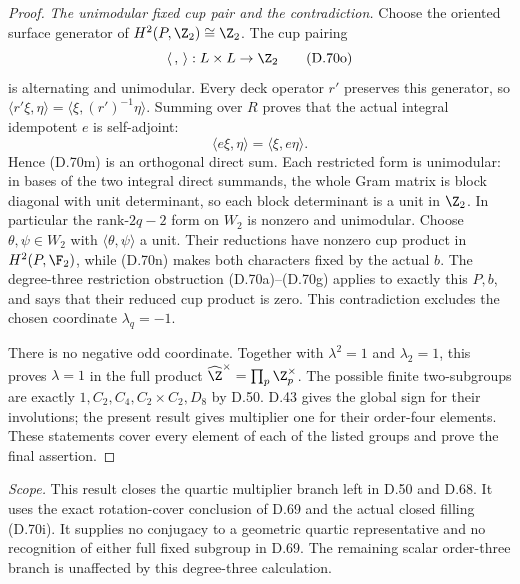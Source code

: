 \begin{proof}
\emph{The unimodular fixed cup pair and the contradiction.}
Choose the oriented surface generator of
$H^2(P,\Z_2)\cong\Z_2$.
The cup pairing
\[
               \langle\, ,\,\rangle:L\times L\to\Z_2
                                                               \tag{D.70o}
\]
is alternating and unimodular.
Every deck operator $r'$ preserves this generator,
so
$\langle r'\xi,\eta\rangle
 =\langle\xi,(r')^{-1}\eta\rangle$.
Summing over $R$ proves that the actual integral
idempotent $e$ is self-adjoint:
\[
                         \langle e\xi,\eta\rangle
                                  =\langle\xi,e\eta\rangle .
                                                               \tag{D.70p}
\]
Hence (D.70m) is an orthogonal direct sum.
Each restricted form is unimodular: in bases
of the two integral direct summands, the whole
Gram matrix is block diagonal with unit
determinant, so each block determinant is a
unit in $\Z_2$.
In particular the rank-$2q-2$ form on $W_2$
is nonzero and unimodular.
Choose $\theta,\psi\in W_2$ with
$\langle\theta,\psi\rangle$ a unit.
Their reductions have nonzero cup product
in $H^2(P,\F_2)$, while (D.70n) makes both
characters fixed by the actual $b$.
The degree-three restriction obstruction
(D.70a)--(D.70g) applies to exactly this $P,b$,
and says that their reduced cup product is zero.
This contradiction excludes the chosen
coordinate $\lambda_q=-1$.

There is no negative odd coordinate.
Together with $\lambda^2=1$ and $\lambda_2=1$,
this proves $\lambda=1$ in the full product
$\widehat\Z^\times=\prod_p\Z_p^\times$.
The possible finite two-subgroups are exactly
$1,C_2,C_4,C_2\times C_2,D_8$ by D.50.
D.43 gives the global sign for their involutions;
the present result gives multiplier one for
their order-four elements. These statements
cover every element of each of the listed
groups and prove the final assertion.
\end{proof}

\emph{Scope.}
This result closes the quartic multiplier branch
left in D.50 and D.68. It uses the exact
rotation-cover conclusion of D.69 and the actual
closed filling (D.70i).
It supplies no conjugacy to a geometric quartic
representative and no recognition of either full
fixed subgroup in D.69.
The remaining scalar order-three branch is
unaffected by this degree-three calculation.
